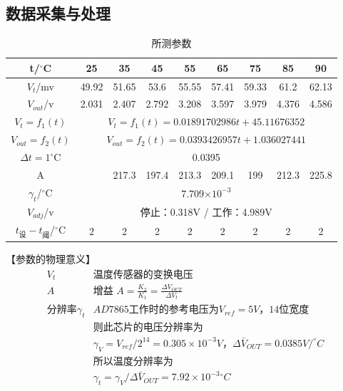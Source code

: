 \documentclass[12pt]{article}
\begin{document}
\subsection{数据采集与处理}
\begin{table}[htbp]
  \centering
  \caption{所测参数}
    \begin{tabular}{|c|c|c|c|c|c|c|c|c|}
    \hline
    t/$^{\circ}$C & 25 & 35 & 45 & 55 & 65 & 75 & 85 & 90  \\
    \hline
    $V_t$/mv & 49.92 & 51.65 & 53.6 & 55.55 & 57.41 & 59.33 & 61.2 & 62.13  \\
    \hline
    $V_{out}$/v & 2.031 & 2.407 & 2.792 & 3.208 & 3.597 & 3.979 & 4.376 & 4.586  \\
    \hline
    $V_t=f_1(t)$ & \multicolumn{8}{c|}{$V_t=f_1(t)=0.01891702986t+45.11676352$}  \\
    \hline
    $V_{out}=f_2(t)$ & \multicolumn{8}{c|}{$V_{out}=f_2(t)=0.0393426957t+1.036027441$}  \\
    \hline
    $\Delta t=1^{\circ}$C & \multicolumn{8}{c|}{0.0395}  \\
    \hline
    A &   & 217.3 & 197.4 & 213.3 & 209.1 & 199 & 212.3 & 225.8  \\
    \hline
    $\gamma_t$/$^{\circ}$C & \multicolumn{8}{c|}{7.709$\times 10^{-3}$ }  \\
    \hline
    $V_{adj}$/v & \multicolumn{8}{c|}{停止：0.318V             /                           工作：4.989V}  \\
    \hline
    $t_{\mbox{设}}-t_{\mbox{阈}}$/$^{\circ}$C & 2 & 2 & 2 & 2 & 2 & 2 & 2 & 2  \\
    \hline
    \end{tabular}%
  \label{tab:addlabel}%
\end{table}%
【参数的物理意义】
\begin{equation}\label{wlyy}
  \begin{array}{ll}
   V_t&\mbox{温度传感器的变换电压} \\
   A&\mbox{增益 }A=\frac{K_2}{K_1}=\frac{\Delta V_{OUT}}{\Delta V_{t}}\\
   \mbox{分辨率}\gamma_t&AD7865\mbox{工作时的参考电压为}V_{ref}=5V \mbox{，14位宽度}\\
   &\mbox{则此芯片的电压分辨率为}\\
   &\gamma_V=V_{ref}/2^{14}=0.305\times10^{-3}V\mbox{，}\Delta\bar{V}_{OUT}=0.0385 V/^{\circ}C\\
   &\mbox{所以温度分辨率为}\\
   &\gamma_t=\gamma_V/\Delta\bar{V}_{OUT}=7.92\times10^{-3}{}^{\circ}C\\
  \end{array}
\end{equation}\par
\end{document}
